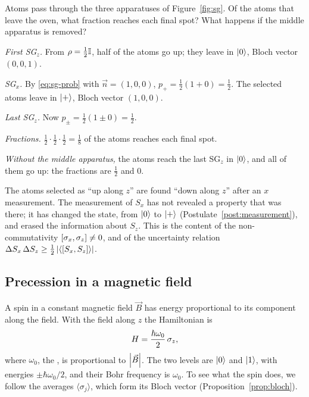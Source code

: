\begin{example}\label{ex:sg-sequence}
  Atoms pass through the three apparatuses of Figure~\ref{fig:sg}. Of the atoms that leave the oven, what fraction reaches each final spot? What happens if the middle apparatus is removed?
\end{example}
\begin{solution}
  \begin{steps}
    \item \emph{First SG$_z$.} From $\rho=\tfrac12\mathbb{I}$, half of the atoms go up; they leave in $\left|0\right\rangle$, Bloch vector $(0,0,1)$.
    \item \emph{SG$_x$.} By \eqref{eq:sg-prob} with $\vec n=(1,0,0)$, $p_+=\tfrac12(1+0)=\tfrac12$. The selected atoms leave in $\left|+\right\rangle$, Bloch vector $(1,0,0)$.
    \item \emph{Last SG$_z$.} Now $p_\pm=\tfrac12(1\pm0)=\tfrac12$.
    \item \emph{Fractions.} $\tfrac12\cdot\tfrac12\cdot\tfrac12=\tfrac18$ of the atoms reaches each final spot.
    \item \emph{Without the middle apparatus,} the atoms reach the last SG$_z$ in $\left|0\right\rangle$, and all of them go up: the fractions are $\tfrac12$ and $0$.
  \end{steps}
  The atoms selected as ``up along $z$'' are found ``down along $z$'' after an $x$ measurement. The measurement of $S_x$ has not revealed a property that was there; it has changed the state, from $\left|0\right\rangle$ to $\left|+\right\rangle$ (Postulate~\ref{post:measurement}), and erased the information about $S_z$. This is the content of the non-commutativity $\left[\sigma_x,\sigma_z\right]\neq0$, and of the uncertainty relation $\Delta S_x\,\Delta S_z\ge\tfrac12\left|\langle\left[S_x,S_z\right]\rangle\right|$.
\end{solution}

\subsection{Precession in a magnetic field}

A spin in a constant magnetic field $\vec B$ has energy proportional to its component along the field. With the field along $z$ the Hamiltonian is
\[
  H=\frac{\hbar\omega_0}2\,\sigma_z,
\]
where $\omega_0$, the , is proportional to $\left|\vec B\right|$. The two levels are $\left|0\right\rangle$ and $\left|1\right\rangle$, with energies $\pm\hbar\omega_0/2$, and their Bohr frequency is $\omega_0$. To see what the spin does, we follow the averages $\langle\sigma_j\rangle$, which form its Bloch vector (Proposition~\ref{prop:bloch}).

